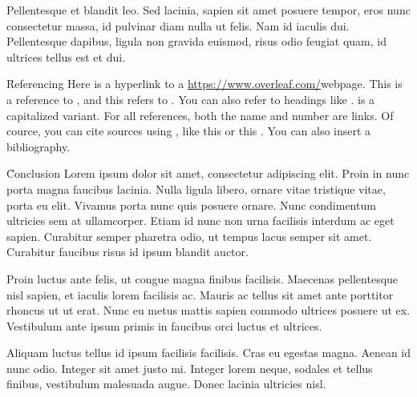 \documentclass{ieee_modern}
\begin{document}
Pellentesque et blandit leo. Sed lacinia, sapien sit amet posuere tempor, eros nunc consectetur massa, id pulvinar diam nulla ut felis. Nam id iaculis dui. Pellentesque dapibus, ligula non gravida euismod, risus odio feugiat quam, id ultrices tellus est et dui.

\h{Referencing}
Here is a hyperlink to a \url{https://www.overleaf.com/}{webpage}. This is a reference to , and this refers to . You can also refer to headings like .  is a capitalized variant. For all references, both the name and number are links. Of cource, you can cite sources using \c{\cite{...}}, like this \cite{minted} or this \cite{tabularray}. You can also insert a bibliography.

\h{Conclusion}
Lorem ipsum dolor sit amet, consectetur adipiscing elit. Proin in nunc porta magna faucibus lacinia. Nulla ligula libero, ornare vitae tristique vitae, porta eu elit. Vivamus porta nunc quis posuere ornare. Nunc condimentum ultricies sem at ullamcorper. Etiam id nunc non urna facilisis interdum ac eget sapien. Curabitur semper pharetra odio, ut tempus lacus semper sit amet. Curabitur faucibus risus id ipsum blandit auctor.

Proin luctus ante felis, ut congue magna finibus facilisis. Maecenas pellentesque nisl sapien, et iaculis lorem facilisis ac. Mauris ac tellus sit amet ante porttitor rhoncus ut ut erat. Nunc eu metus mattis sapien commodo ultrices posuere ut ex. Vestibulum ante ipsum primis in faucibus orci luctus et ultrices.

Aliquam luctus tellus id ipsum facilisis facilisis. Cras eu egestas magna. Aenean id nunc odio. Integer sit amet justo mi. Integer lorem neque, sodales et tellus finibus, vestibulum malesuada augue. Donec lacinia ultricies nisl.

\toc

\end{document}
